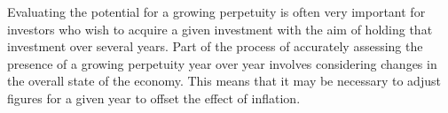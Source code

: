 Evaluating the potential for a growing perpetuity is often very important for investors who wish to acquire a given investment with the aim of holding that investment over several years. Part of the process of accurately assessing the presence of a growing perpetuity year over year involves considering changes in the overall state of the economy. This means that it may be necessary to adjust figures for a given year to offset the effect of inflation.\\[10pt]
